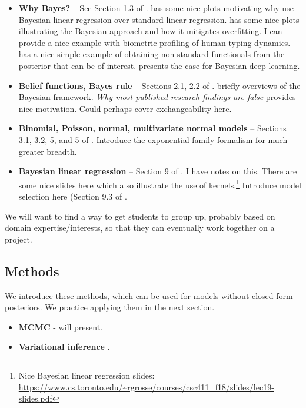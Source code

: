 \documentclass{article} %
\begin{document}
\begin{itemize}
\item \textbf{Why Bayes?} -- See Section 1.3 of \cite{hoff2009first}.   \cite{bishop2006pattern} has some nice plots motivating why use Bayesian linear regression over standard linear regression.   \cite{ghahramani2013bayesian}  has some nice plots illustrating the Bayesian approach and how it mitigates overfitting.   I can provide a nice example with biometric profiling of human typing dynamics.   \cite{held2006bayesian} has a nice simple example of obtaining non-standard functionals from the posterior that can be of interest.   \cite{wilson2020case} presents the case for Bayesian deep learning.  
\item \textbf{Belief functions,  Bayes rule} -- Sections 2.1,  2.2 of \cite{hoff2009first}.   \cite{ghahramani2013bayesian} briefly overviews of the Bayesian framework.  \textit{Why most published research findings are false} \cite{ioannidis2005most} provides nice motivation.    Could perhaps cover exchangeability here. 
\item \textbf{Binomial, Poisson, normal, multivariate normal models} -- Sections 3.1,  3.2, 5, and 5 of \cite{hoff2009first}.     Introduce the exponential family formalism \cite{wojnowiczXXXXexponential} for much greater breadth. 
\item \textbf{Bayesian linear regression} -- Section 9 of \cite{hoff2009first}.     I have notes on this.   There are some nice slides here which also illustrate the use of kernels.\footnote{Nice Bayesian linear regression slides: \url{https://www.cs.toronto.edu/~rgrosse/courses/csc411_f18/slides/lec19-slides.pdf}}   Introduce model selection here (Section 9.3 of \cite{hoff2009first}. 
\end{itemize}

We will want to find a way to get students to group up,  probably based on domain expertise/interests,  so that they can eventually work together on a project.  

\subsection{Methods}

We introduce these methods,  which can be used for models without closed-form posteriors.  We practice applying them in the next section.  

\begin{itemize}
\item \textbf{MCMC} -  will present.
\item \textbf{Variational inference} \cite{wojnowiczXXXXfoundations}.
\end{itemize} 
\end{document}

